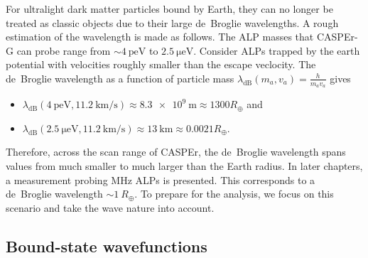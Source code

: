 For ultralight dark matter particles bound by Earth, they can no longer be treated as classic objects due to their large de~Broglie wavelengths.
A rough estimation of the wavelength is made as follows.
The ALP masses that CASPEr-G can probe range from $\sim\SI{4}{\pico\eV}$ to $\SI{2.5}{\micro\eV}$.
Consider ALPs trapped by the earth potential with velocities roughly smaller than the escape veclocity.
The de~Broglie wavelength as a function of particle mass $\lambda_\mathrm{dB}(m_a, v_a) = \frac{h}{m_a v_a}$ gives
\begin{itemize}
    \item $\lambda_\mathrm{dB}(\SI{4}{\pico\eV}, \SI{11.2}{\km/\second}) \approx \SI{8.3e9}{\m} \approx 1300 R_\oplus$ and
    \item $\lambda_\mathrm{dB}(\SI{2.5}{\micro\eV}, \SI{11.2}{\km/\second}) \approx \SI{13}{\km} \approx 0.0021 R_\oplus$.
\end{itemize}
Therefore, across the scan range of CASPEr, the de~Broglie wavelength spans values from much smaller to much larger than the Earth radius.
In later chapters, a measurement probing MHz ALPs is presented.
This corresponds to a de~Broglie wavelength $\sim\SI{1}{R_\oplus}$.
To prepare for the analysis, we focus on this scenario and take the wave nature into account.

\subsection{Bound-state wavefunctions}\label{sec:theory:earthALP:wavefunctions}

